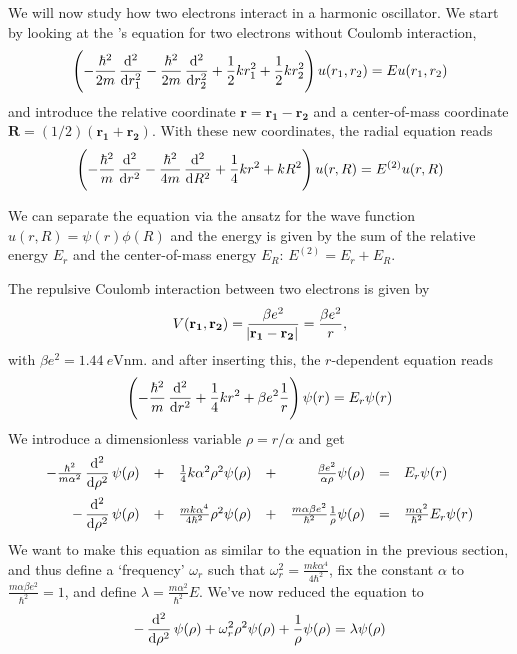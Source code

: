 \documentclass[a4paper]{revtex4}
\begin{document}
We will now study how two electrons interact in a harmonic oscillator. We
start by looking at the \se's equation for two electrons without Coulomb
interaction,
\begin{equation}
  \left(
  -\frac{\hbar^2}{2m}
  \dod[2]{}{r_1}
  -\frac{\hbar^2}{2m}
  \dod[2]{}{r_2}
  + \frac{1}{2} k r_1^2
  + \frac{1}{2} k r_2^2
  \right)
  u(r_1, r_2)
  =
  Eu(r_1, r_2)
\end{equation}
and introduce the relative coordinate $\mathbf{r} = \mathbf{r_1} -
\mathbf{r_2}$ and a center-of-mass coordinate $\mathbf{R} = (1/2)(\mathbf{r_1} +
\mathbf{r_2})$. With these new coordinates, the radial \se equation reads
\begin{equation}
  \left(
  -\frac{\hbar^2}{m}
  \dod[2]{}{r}
  -\frac{\hbar^2}{4m}
  \dod[2]{}{R}
  + \frac{1}{4} k r^2
  + k R^2
  \right)
  u(r, R)
  =
  E^{(2)} u(r, R)
\end{equation}

We can separate the equation via the ansatz for the wave function $u(r, R) =
\psi(r)\phi(R)$ and the energy is given by the sum of the relative energy
$E_r$ and the center-of-mass energy $E_R$: $E^{(2)} = E_r + E_R$.

The repulsive Coulomb interaction between two electrons is given by
\begin{equation}
  V(\mathbf{r_1}, \mathbf{r_2}) =
  \frac{\beta e^2}{\abs{\mathbf{r_1} - \mathbf{r_2}}} =
  \frac{\beta e^2}{r},
\end{equation}
with $\beta e^2 = \SI{1.44}{e\volt\nano\meter}$.
and after inserting this, the $r$-dependent \se{} equation reads
\begin{equation}
  \left(
  -\frac{\hbar^2}{m}
  \dod[2]{}{r}
  + \frac{1}{4} k r^2
  + \beta e^2 \frac{1}{r}
  \right)
  \psi(r)
  =
  E_r \psi(r)
\end{equation}
We introduce a dimensionless variable $\rho = r/\alpha$ and get
\begin{equation*}
  \begin{array}{rlrlrll}
  - \frac{\hbar^2}{m\alpha^2}
  \dod[2]{}{\rho} \psi(\rho)
  &+& \frac{1}{4} k \alpha^2 \rho^2
  \psi(\rho)
  &+& \frac{\beta e^2}{\alpha\rho}
  \psi(\rho)
  &=&
  E_r \psi(r)
  \vspace{0.2cm}
  \\
  -
  \dod[2]{}{\rho} \psi(\rho)
  &+& \frac{mk\alpha^4}{4 \hbar^2} \rho^2
  \psi(\rho)
  &+& \frac{m\alpha\beta e^2}{\hbar^2}
  \frac{1}{\rho}
  \psi(\rho)
  &=&
  \frac{m \alpha^2}{\hbar^2}
  E_r \psi(r)
  \end{array}
\end{equation*}
We want to make this equation as similar to the equation in the previous
section, and thus define a `frequency' $\omega_r$ such that
$\omega_r^2 = \frac{mk\alpha^4}{4 \hbar^2}$, fix the constant $\alpha$ to
$\frac{m\alpha\beta e^2}{\hbar^2} = 1$, and define $\lambda =
\frac{m\alpha^2}{\hbar^2} E$. We've now reduced the \se{} equation to
\begin{equation}
  -
  \dod[2]{}{\rho} \psi(\rho)
  + \omega_r^2 \rho^2 \psi(\rho)
  + \frac{1}{\rho} \psi(\rho)
  =
  \lambda \psi(\rho)
\end{equation}
\end{document}
